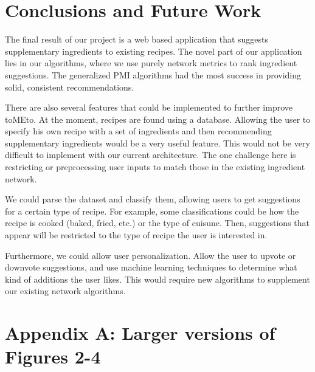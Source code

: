 \documentclass{acm_proc_article-sp}
\begin{document}
\section{Conclusions and Future Work}

The final result of our project is a web based application that suggests supplementary ingredients to existing recipes. The novel part of our application lies in our algorithms, where we use purely network metrics to rank ingredient suggestions. The generalized PMI algorithms had the most success in providing solid, consistent recommendations.

There are also several features that could be implemented to further improve toMEto. At the moment, recipes are found using a database. Allowing the user to specify his own recipe with a set of ingredients and then recommending supplementary ingredients would be a very useful feature. This would not be very difficult to implement with our current architecture. The one challenge here is restricting or preprocessing user inputs to match those in the existing ingredient network.

We could parse the dataset and classify them, allowing users to get suggestions for a certain type of recipe. For example, some classifications could be how the recipe is cooked (baked, fried, etc.) or the type of cuisune. Then, suggestions that appear will be restricted to the type of recipe the user is interested in.

Furthermore, we could allow user personalization. Allow the user to upvote or downvote suggestions, and use machine learning techniques to determine what kind of additions the user likes. This would require new algorithms to supplement our existing network algorithms.


% 






\clearpage
\onecolumn
\section*{Appendix A: Larger versions of Figures 2-4}
\vspace{3mm} %
\end{document}
